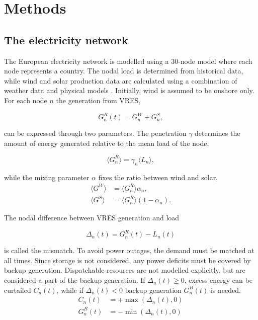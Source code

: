 \documentclass[a4paper, 5p, sort&compress]{elsarticle}%
\newcommand{\mean}[1]{\langle #1 \rangle}
\newcommand{\paren}[1]{\left(#1\right)}
\begin{document}
\section{Methods}
\label{sec:two}
\subsection{The electricity network}

The European electricity network is modelled using a 30-node model
where each node represents a country. The nodal load is determined
from historical data, while wind and solar production data are
calculated using a combination of weather data and physical
models \cite{REA}. Initially, wind is assumed to be onshore only. For
each node $n$ the generation from VRES,

\begin{equation}
  G^{R}_{n}(t) = G_{n}^{W} + G_{n}^{S},
\end{equation} 

can be expressed through two parameters. The penetration $\gamma$
determines the amount of energy generated relative to the mean load of
the node,

\begin{equation}
  \mean{G^{R}_{n}} = \gamma_{n} \mean{L_{n}} ,
\end{equation} 

while the mixing parameter $\alpha$ fixes the ratio between wind and solar,
\begin{align}
  \mean{G^{W}} &= \mean{G_{n}^{R}} \alpha_{n}  , \\
  \mean{G^{S}} &= \mean{G_{n}^{R}} \paren{1- \alpha_{n}}  .
\end{align} 

The nodal difference between VRES generation and load

\begin{equation}
  \Delta_{n}(t) = G^{R}_{n}(t) - L_{n}(t)
\end{equation}

is called the mismatch. To avoid power outages, the demand must be
matched at all times. Since storage is not considered, any power
deficits must be covered by backup generation. Dispatchable
resources are not modelled explicitly, but are considered a part of
the backup generation. If $\Delta_{n}(t) \geq 0$, excess energy can be
curtailed $C_{n}(t)$, while if $\Delta_{n}(t) < 0$ backup generation
$G^{B}_{n}(t)$ is needed.
\begin{align}
  C_{n}(t) &= + \max \paren{\Delta_{n}(t),0} \\
  G^{B}_{n}(t) &= - \min \phantom{} \paren{\Delta_{n}(t),0} 
\end{align}
\end{document}
